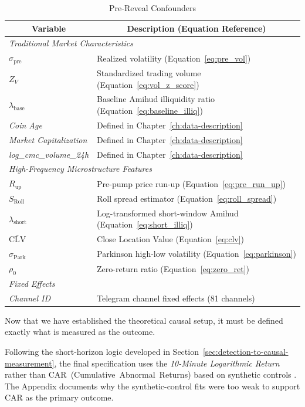 \begin{table}[htbp]
\centering
\caption{Pre-Reveal Confounders}
\label{tab:confounder-list}
\begin{tabular}{|l|l|}
\toprule
\multicolumn{1}{|c|}{\textbf{Variable}} & \multicolumn{1}{c|}{\textbf{Description (Equation Reference)}} \\
\midrule
\multicolumn{2}{|l|}{\textit{Traditional Market Characteristics}} \\
$\sigma_{\text{pre}}$ & Realized volatility (Equation~\eqref{eq:pre_vol}) \\
$Z_V$ & Standardized trading volume (Equation~\eqref{eq:vol_z_score}) \\
$\lambda_{\text{base}}$ & Baseline Amihud illiquidity ratio (Equation~\eqref{eq:baseline_illiq}) \\
\textit{Coin Age} & Defined in Chapter~\ref{ch:data-description} \\
\textit{Market Capitalization} & Defined in Chapter~\ref{ch:data-description} \\
\textit{log\_cmc\_volume\_24h} & Defined in Chapter~\ref{ch:data-description} \\
\midrule
\multicolumn{2}{|l|}{\textit{High-Frequency Microstructure Features}} \\
$R_{\text{up}}$ & Pre-pump price run-up (Equation~\eqref{eq:pre_run_up}) \\
$S_{\text{Roll}}$ & Roll spread estimator (Equation~\eqref{eq:roll_spread}) \\
$\lambda_{\text{short}}$ & Log-transformed short-window Amihud (Equation~\eqref{eq:short_illiq}) \\
$\overline{\text{CLV}}$ & Close Location Value (Equation~\eqref{eq:clv}) \\
$\sigma_{\text{Park}}$ & Parkinson high-low volatility (Equation~\eqref{eq:parkinson}) \\
$\rho_0$ & Zero-return ratio (Equation~\eqref{eq:zero_ret}) \\
\midrule
\multicolumn{2}{|l|}{\textit{Fixed Effects}} \\
\textit{Channel ID} & Telegram channel fixed effects (81 channels) \\
\bottomrule
\end{tabular}
\ownsource
\end{table}

Now that we have established the theoretical causal setup, it must be defined exactly what is measured as the outcome.

Following the short-horizon logic developed in Section~\ref{sec:detection-to-causal-measurement}, the final specification uses the \textit{10-Minute Logarithmic Return} rather than CAR~\mbox{(Cumulative Abnormal Returns)} based on synthetic controls \cite{abadie2010synthetic}. The Appendix documents why the synthetic-control fits were too weak to support CAR as the primary outcome.

